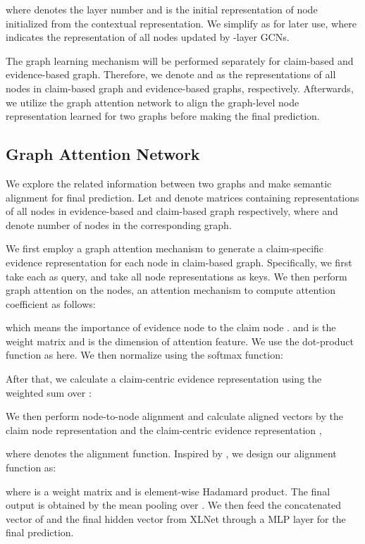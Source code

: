 \documentclass[11pt,a4paper]{article}
\begin{document}
where  denotes the layer number and  is the initial representation of node  initialized from the contextual representation. We simplify  as  for later use, where  indicates the representation of all nodes updated by -layer GCNs.

The graph learning mechanism will be performed separately for claim-based and evidence-based graph. 
Therefore, we denote  and  as the representations of all nodes in claim-based graph and evidence-based graphs, respectively. 
Afterwards, we utilize the graph attention network to align the graph-level node representation learned for two graphs before making the final prediction.

\subsection{Graph Attention Network}
\label{sectin:graph-attention-net}
We explore the related information between two graphs and make semantic alignment for final prediction.
Let  and  denote matrices containing representations of all nodes in evidence-based and claim-based graph respectively, where  and  denote number of nodes in the corresponding graph. 
\par
We first employ a graph attention mechanism \cite{velivckovic2017graph} to generate a claim-specific evidence representation for each node in claim-based graph. Specifically, we first take each  as query, and take all node representations  as keys. 
We then perform graph attention on the nodes, an attention mechanism 
 to compute attention coefficient as follows:
 
which means the importance of evidence node  to the claim node . 
 and  is the weight matrix and  is the dimension of attention feature. 
We use the dot-product function as  here.
We then normalize  using the softmax function:

After that, we calculate a claim-centric evidence representation  using the weighted sum over :

We then perform node-to-node alignment and calculate aligned vectors  by the claim node representation  and the claim-centric evidence representation ,

where  denotes the alignment function. Inspired by , we design our alignment function as:

where  is a weight matrix and  is element-wise Hadamard product. 
The final output  is obtained by the mean pooling over . 
We then feed the concatenated vector of  and the final hidden vector  from XLNet through a MLP layer for the final prediction.
\end{document}
